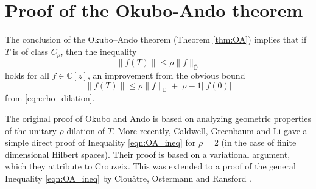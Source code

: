 \documentclass[12pt]{amsart}
\newtheorem{theorem}{Theorem}[section]
\theoremstyle{definition}
\begin{document}
%
%


%
%

\section{Proof of the Okubo-Ando theorem}
\label{secoa}

The conclusion of the Okubo--Ando theorem (Theorem \ref{thm:OA}) implies
that if $T$ is of class $C_\rho$, then the inequality
\begin{equation}
  \label{eqn:OA_ineq}
  \|f(T)\| \le \rho \|f\|_{\overline{\mathbb{D}}}
\end{equation}
holds for all $f \in \mathbb{C}[z]$, an improvement from the obvious bound
\[
\|f(T)\| \le \rho  \|f\|_{\overline{\mathbb{D}}} + |\rho -1| |f(0)|
\]
from \eqref{eqn:rho_dilation}.

The original proof  of Okubo and Ando \cite{OA75} is based on analyzing geometric properties of the unitary $\rho$-dilation of $T$.
More recently, Caldwell, Greenbaum and Li \cite{CGL17} gave a simple direct proof of Inequality \eqref{eqn:OA_ineq} for $\rho = 2$
(in the case of finite dimensional Hilbert spaces). Their proof is based on a variational argument, which they attribute to Crouzeix.
This was extended to a proof of the general Inequality \eqref{eqn:OA_ineq} by Clou\^atre, Ostermann and Ransford \cite{COR23}.
\end{document}
